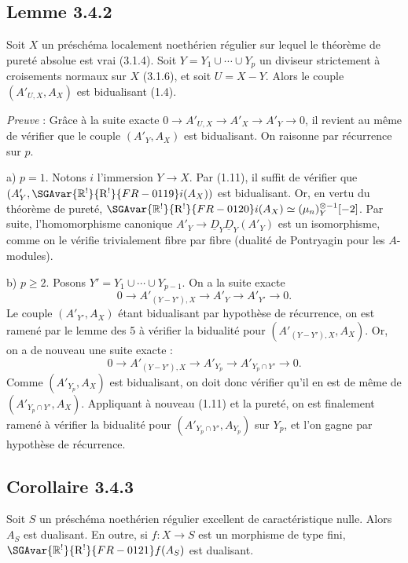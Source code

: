 \subsection*{Lemme 3.4.2}
Soit $X$ un préschéma localement noethérien régulier sur lequel le théorème de pureté absolue est vrai (3.1.4). Soit $Y = Y_1 \cup \cdots \cup Y_p$ un diviseur strictement à croisements normaux sur $X$ (3.1.6), et soit $U = X - Y$. Alors le couple $(A'_{U,X}, A_X)$ est bidualisant (1.4).

\emph{Preuve} : Grâce à la suite exacte $0 \to A'_{U,X} \to A'_X \to A'_Y \to 0$, il revient au même de vérifier que le couple $(A'_Y, A_X)$ est bidualisant. On raisonne par récurrence sur $p$.

a) $p = 1$. Notons $i$ l'immersion $Y \to X$. Par (1.11), il suffit de vérifier que $(A'_Y, \SGAvar{\mathbb{R}^{!}}{\mathrm{R}^{!}}{FR-0119}i(A_X))$ est bidualisant. Or, en vertu du théorème de pureté, $\SGAvar{\mathbb{R}^{!}}{\mathrm{R}^{!}}{FR-0120}i(A_X) \simeq (\mu_n)^{\otimes -1}_Y[-2]$. Par suite, l'homomorphisme canonique $A'_Y \to \underline{D}_Y \underline{D}_Y(A'_Y)$ est un isomorphisme, comme on le vérifie trivialement fibre par fibre (dualité de Pontryagin pour les $A$-modules).

b) $p \geqslant 2$. Posons $Y' = Y_1 \cup \cdots \cup Y_{p-1}$. On a la suite exacte
\[
0 \longrightarrow A'_{(Y-Y'),X} \longrightarrow A'_Y \longrightarrow A'_{Y'} \longrightarrow 0.
\]
Le couple $(A'_{Y'}, A_X)$ étant bidualisant par hypothèse de récurrence, on est ramené par le lemme des 5 à vérifier la bidualité pour $(A'_{(Y-Y'),X}, A_X)$. Or, on a de nouveau une suite exacte :
\[
0 \longrightarrow A'_{(Y-Y'),X} \longrightarrow A'_{Y_p} \longrightarrow A'_{Y_p \cap Y'} \longrightarrow 0.
\]
Comme $(A'_{Y_p}, A_X)$ est bidualisant, on doit donc vérifier qu'il en est de même de $(A'_{Y_p \cap Y'}, A_X)$. Appliquant à nouveau (1.11) et la pureté, on est finalement ramené à vérifier la bidualité pour $(A'_{Y_p \cap Y'}, A_{Y_p})$ sur $Y_p$, et l'on gagne par hypothèse de récurrence.

\subsection*{Corollaire 3.4.3}
Soit $S$ un préschéma noethérien régulier excellent de caractéristique nulle. Alors $A_S$ est dualisant. En outre, si $f : X \to S$ est un morphisme de type fini, $\SGAvar{\mathbb{R}^{!}}{\mathrm{R}^{!}}{FR-0121}f(A_S)$ est dualisant.

